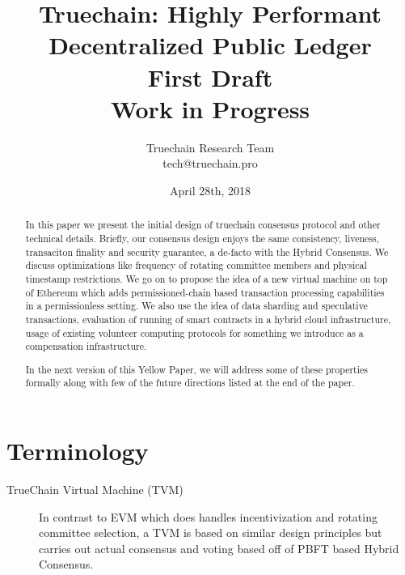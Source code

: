 \documentclass[9pt,oneside]{amsart}
\title{%
  \bf Truechain: Highly Performant Decentralized Public Ledger \\
  \small First Draft \\
  \small Work in Progress}
\date{April 28th, 2018}
\author{%
  Truechain Research Team \\
  tech@truechain.pro}
\begin{document}
\pagecolor{yellowpapercolor}

\begin{abstract}
In this paper we present the initial design of truechain consensus protocol and other technical details.
Briefly, our consensus design enjoys the same consistency, liveness, transaciton finality and security guarantee, a
de-facto with the Hybrid Consensus. We discuss optimizations like frequency of rotating committee members and physical
timestamp restrictions. We go on to propose the idea of a new virtual machine on top of Ethereum which adds
permissioned-chain based transaction processing capabilities in a permissionless setting. We also use the idea of
data sharding and speculative transactions, evaluation of running of smart contracts in a hybrid cloud infrastructure,
usage of existing volunteer computing protocols for something we introduce as a compensation infrastructure.

In the next version of this Yellow Paper, we will address some of these properties formally along with few of the future
directions listed at the end of the paper.
\end{abstract}

\maketitle

\setlength{\columnsep}{20pt}
\begin{multicols}{2}








% 








\end{multicols}

\appendix

\section{Terminology} \label{ch:Terminology}

\begin{description}
\item[TrueChain Virtual Machine (TVM)] In contrast to EVM which does handles incentivization and rotating committee selection,
  a TVM is based on similar design principles but carries out actual consensus and voting based off of PBFT based Hybrid Consensus.
\end{description}
\end{document}
